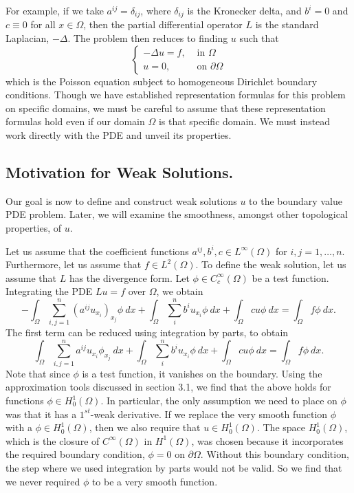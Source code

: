 \documentclass[10pt]{article}
\begin{document}
For example, if we take $a^{ij} = \delta_{ij}$, where $\delta_{ij}$ is the Kronecker delta, and $b^i = 0$ and $c \equiv 0$ for all $x \in \Omega$, then the partial differential operator $L$ is the standard Laplacian, $-\Delta$. The problem then reduces to finding $u$ such that
\begin{equation*}
	\displaystyle \begin{cases}
		-\Delta u = f, & \textrm{ in } \Omega \\
		u = 0, & \textrm{ on } \partial \Omega
	\end{cases}
\end{equation*}
which is the Poisson equation subject to homogeneous Dirichlet boundary conditions. Though we have established representation formulas for this problem on specific domains, we must be careful to assume that these representation formulas hold even if our domain $\Omega$ is that specific domain. We must instead work directly with the PDE and unveil its properties. 
\subsection{Motivation for Weak Solutions.}
Our goal is now to define and construct weak solutions $u$ to the boundary value PDE problem. Later, we will examine the smoothness, amongst other topological properties, of $u$. 

Let us assume that the coefficient functions $a^{ij}, b^i, c \in L^\infty(\Omega)$ for $i,j = 1,\dots,n$. Furthermore, let us assume that $f \in L^2(\Omega)$. To define the weak solution, let us assume that $L$ has the divergence form. Let $\phi \in C^{\infty}_c(\Omega)$ be a test function. Integrating the PDE $Lu = f$ over $\Omega$, we obtain 
\begin{equation*}
	\displaystyle -\int_{\Omega}{\sum\limits_{i,j=1}^{n}{\left( a^{ij}u_{x_i}\right)_{x_j}}\phi \: dx} + \int_{\Omega}{\sum\limits_{i}^{n}{b^{i}u_{x_i}}\phi \: dx} + \int_{\Omega}{cu\phi \: dx} = \int_{\Omega}{f\phi \: dx}. 
\end{equation*}
The first term can be reduced using integration by parts, to obtain
\begin{equation*}
	\displaystyle \int_{\Omega}{\sum\limits_{i,j=1}^{n}{a^{ij}u_{x_i}}\phi_{x_j} \: dx} + \int_{\Omega}{\sum\limits_{i}^{n}{b^{i}u_{x_i}}\phi \: dx} + \int_{\Omega}{cu\phi \: dx} = \int_{\Omega}{f\phi \: dx}.
\end{equation*}
Note that since $\phi$ is a test function, it vanishes on the boundary. Using the approximation tools discussed in section 3.1, we find that the above holds for functions $\phi \in H_0^1(\Omega)$. In particular, the only assumption we need to place on $\phi$ was that it has a $1^{st}$-weak derivative. If we replace the very smooth function $\phi$ with a $\phi \in H_0^1(\Omega)$, then we also require that $u \in H_0^1(\Omega)$. The space $H_0^1(\Omega)$, which is the closure of $C^{\infty}(\Omega)$ in $H^1(\Omega)$, was chosen because it incorporates the required boundary condition, $\phi = 0$ on $\partial \Omega$. Without this boundary condition, the step where we used integration by parts would not be valid. So we find that we never required $\phi$ to be a very smooth function.
\end{document}
